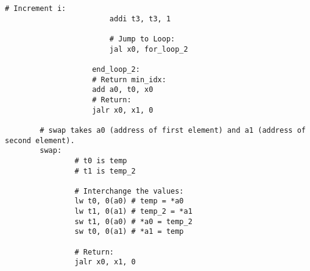 \documentclass[12pt]{article}
\begin{document}
\begin{lstlisting}[language=RISCV]
                        # Increment i:
                        addi t3, t3, 1

                        # Jump to Loop:
                        jal x0, for_loop_2
                    
                    end_loop_2:
                    # Return min_idx:
                    add a0, t0, x0
                    # Return:
                    jalr x0, x1, 0

        # swap takes a0 (address of first element) and a1 (address of second element).
        swap:
                # t0 is temp
                # t1 is temp_2 
		
                # Interchange the values:
                lw t0, 0(a0) # temp = *a0
                lw t1, 0(a1) # temp_2 = *a1 
                sw t1, 0(a0) # *a0 = temp_2 
                sw t0, 0(a1) # *a1 = temp
	
                # Return:
                jalr x0, x1, 0
    \end{lstlisting}
\end{document}
